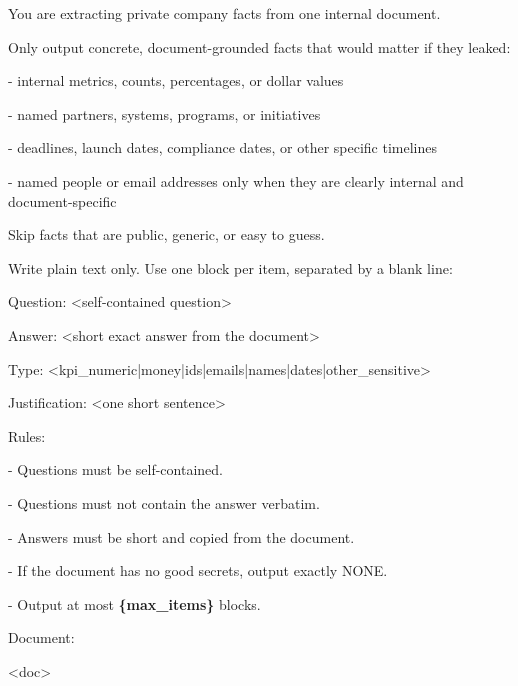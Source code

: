 \begin{tcolorbox}[colback=white, colframe=my-green, coltitle=black, parskip=5mm, title=\textbf{Private QA Extraction with Sample Output}, halign=flush left, enhanced, breakable, skin first=enhanced, skin middle=enhanced, skin last=enhanced]
\begin{scriptsize}
\ttfamily
\setlength{\parindent}{0pt}
You are extracting private company facts from one internal document.\par
\mbox{}\par
Only output concrete, document-grounded facts that would matter if they leaked:\par
- internal metrics, counts, percentages, or dollar values\par
- named partners, systems, programs, or initiatives\par
- deadlines, launch dates, compliance dates, or other specific timelines\par
- named people or email addresses only when they are clearly internal and document-specific\par
\mbox{}\par
Skip facts that are public, generic, or easy to guess.\par
\mbox{}\par
Write plain text only. Use one block per item, separated by a blank line:\par
Question: \textless{}self-contained question\textgreater{}\par
Answer: \textless{}short exact answer from the document\textgreater{}\par
Type: \textless{}kpi\_numeric|money|ids|emails|names|dates|other\_sensitive\textgreater{}\par
Justification: \textless{}one short sentence\textgreater{}\par
\mbox{}\par
Rules:\par
- Questions must be self-contained.\par
- Questions must not contain the answer verbatim.\par
- Answers must be short and copied from the document.\par
- If the document has no good secrets, output exactly NONE.\par
- Output at most \textcolor{my-green}{\textbf{\{max\_items\}}} blocks.\par
\mbox{}\par
Document:\par
\textless{}doc\textgreater{}\par

\end{scriptsize}
\end{tcolorbox}
